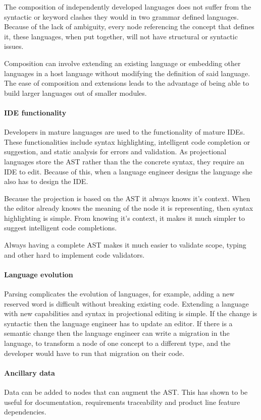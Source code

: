 The composition of independently developed languages does not suffer from the syntactic or keyword clashes they would in two grammar defined languages.
Because of the lack of ambiguity, every node referencing the concept that defines it, these languages, when put together, will not have structural or syntactic issues.

Composition can involve extending an existing language or embedding other languages in a host language without modifying the definition of said language.
The ease of composition and extensions leads to the advantage of being able to build larger languages out of smaller modules.

\paragraph{IDE functionality}
Developers in mature languages are used to the functionality of mature IDEs.
These functionalities include syntax highlighting, intelligent code completion or suggestion, and static analysis for errors and validation.
As projectional languages store the AST rather than the the concrete syntax, they require an IDE to edit.
Because of this, when a language engineer designs the language she also has to design the IDE.

Because the projection is based on the AST it always knows it's context.
When the editor already knows the meaning of the node it is representing, then syntax highlighting is simple.
From knowing it's context, it makes it much simpler to suggest intelligent code completions.

Always having a complete AST makes it much easier to validate scope, typing and other hard to implement code validators.

\paragraph{Language evolution}
Parsing complicates the evolution of languages, for example, adding a new reserved word is difficult without breaking existing code.
Extending a language with new capabilities and syntax in projectional editing is simple.
If the change is syntactic then the language engineer has to update an editor.
If there is a semantic change then the language engineer can write a migration in the language, to transform a node of one concept to a different type, and the developer would have to run that migration on their code.

\paragraph{Ancillary data}
Data can be added to nodes that can augment the AST. 
This has shown to be useful for documentation, requirements traceability and product line feature dependencies.

